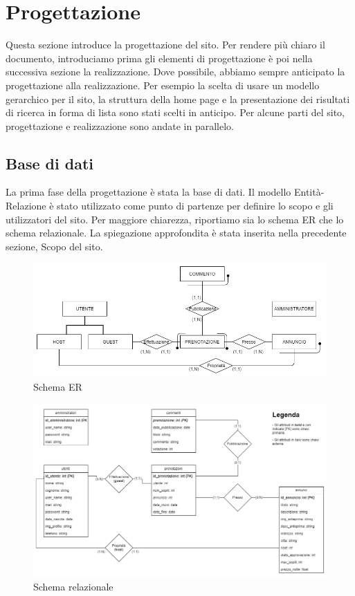 \documentclass[1_relazione.tex]{subfiles}
\begin{document}
\section{Progettazione}
Questa sezione introduce la progettazione del sito. Per rendere più chiaro il documento, introduciamo prima gli elementi di progettazione è poi nella successiva sezione la realizzazione. Dove possibile, abbiamo sempre anticipato la progettazione alla realizzazione. Per esempio la scelta di usare un modello gerarchico per il sito, la struttura della home page e la presentazione dei risultati di ricerca in forma di lista sono stati scelti in anticipo. Per alcune parti del sito, progettazione e realizzazione sono andate in parallelo. 

\subsection{Base di dati}
La prima fase della progettazione è stata la base di dati.  Il modello Entità-Relazione è stato utilizzato come punto di partenze per definire lo scopo e gli utilizzatori del sito. Per maggiore chiarezza, riportiamo sia lo schema ER che lo schema relazionale. La spiegazione approfondita è stata inserita nella precedente sezione, Scopo del sito.

\begin{figure}[h!]
\centering
\includegraphics[scale=0.5]{immagini/schema_ER-2}
\caption{Schema ER}
\end{figure}

\begin{figure}[h!]
\centering
\includegraphics[scale=0.4]{immagini/schema_relazionale-2}
\caption{Schema relazionale}
\end{figure}
\end{document}
